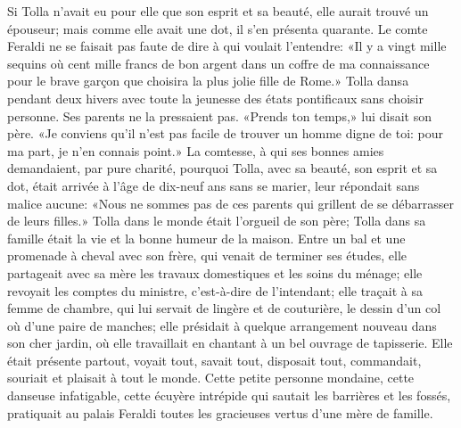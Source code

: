 Si Tolla n’avait eu pour elle que son esprit et sa beauté, elle aurait trouvé un épouseur; mais comme elle avait une dot, il s’en présenta quarante. Le comte Feraldi ne se faisait pas faute de dire à qui voulait l’entendre: «Il y a vingt mille sequins où cent mille francs de bon argent dans un coffre de ma connaissance pour le brave garçon que choisira la plus jolie fille de Rome.» Tolla dansa pendant deux hivers avec toute la jeunesse des états pontificaux sans choisir personne. Ses parents ne la pressaient pas. «Prends ton temps,» lui disait son père. «Je conviens qu’il n’est pas facile de trouver un homme digne de toi: pour ma part, je n’en connais point.» La comtesse, à qui ses bonnes amies demandaient, par pure charité, pourquoi Tolla, avec sa beauté, son esprit et sa dot, était arrivée à l’âge de dix-neuf ans sans se marier, leur répondait sans malice aucune: «Nous ne sommes pas de ces parents qui grillent de se débarrasser de leurs filles.» Tolla dans le monde était l’orgueil de son père; Tolla dans sa famille était la vie et la bonne humeur de la maison. Entre un bal et une promenade à cheval avec son frère, qui venait de terminer ses études, elle partageait avec sa mère les travaux domestiques et les soins du ménage; elle revoyait les comptes du ministre, c’est-à-dire de l’intendant; elle traçait à sa femme de chambre, qui lui servait de lingère et de couturière, le dessin d’un col où d’une paire de manches; elle présidait à quelque arrangement nouveau dans son cher jardin, où elle travaillait en chantant à un bel ouvrage de tapisserie. Elle était présente partout, voyait tout, savait tout, disposait tout, commandait, souriait et plaisait à tout le monde. Cette petite personne mondaine, cette danseuse infatigable, cette écuyère intrépide qui sautait les barrières et les fossés, pratiquait au palais Feraldi toutes les gracieuses vertus d’une mère de famille.
